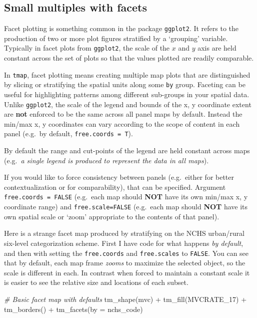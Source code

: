 \documentclass[
]{book}
\newenvironment{Shaded}{\begin{snugshade}}{\end{snugshade}}
\newcommand{\AttributeTok}[1]{\textcolor[rgb]{0.77,0.63,0.00}{#1}}
\newcommand{\CommentTok}[1]{\textcolor[rgb]{0.56,0.35,0.01}{\textit{#1}}}
\newcommand{\FunctionTok}[1]{\textcolor[rgb]{0.00,0.00,0.00}{#1}}
\newcommand{\NormalTok}[1]{#1}
\newcommand{\SpecialCharTok}[1]{\textcolor[rgb]{0.00,0.00,0.00}{#1}}
\newcommand{\StringTok}[1]{\textcolor[rgb]{0.31,0.60,0.02}{#1}}
\begin{document}
\hypertarget{tmap-facet}{%
\subsection{Small multiples with facets}\label{tmap-facet}}

Facet plotting is something common in the package \texttt{ggplot2}. It refers to the production of two or more plot figures stratified by a `grouping' variable. Typically in facet plots from \texttt{ggplot2}, the scale of the \(x\) and \(y\) axis are held constant across the set of plots so that the values plotted are readily comparable.

In \texttt{tmap}, facet plotting means creating multiple map plots that are distinguished by slicing or stratifying the spatial units along some \texttt{by} group. Faceting can be useful for highlighting patterns among different sub-groups in your spatial data. Unlike \texttt{ggplot2}, the scale of the legend and bounds of the x, y coordinate extent are \textbf{not} enforced to be the same across all panel maps by default. Instead the min/max x, y coordinates can vary according to the scope of content in each panel (e.g.~by default, \texttt{free.coords\ =\ T}).

By default the range and cut-points of the legend are held constant across maps (e.g.~\emph{a single legend is produced to represent the data in all maps}).

If you would like to force consistency between panels (e.g.~either for better contextualization or for comparability), that can be specified. Argument \texttt{free.coords\ =\ FALSE} (e.g.~each map should \textbf{NOT} have its own min/max x, y coordinate range) and \texttt{free.scale=FALSE} (e.g.~each map should \textbf{NOT} have its own spatial scale or `zoom' appropriate to the contents of that panel).

Here is a strange facet map produced by stratifying on the NCHS urban/rural six-level categorization scheme. First I have code for what happens \emph{by default}, and then with setting the \texttt{free.coords} and \texttt{free.scales} to \texttt{FALSE}. You can see that by default, each map frame \emph{zooms} to maximize the selected object, so the scale is different in each. In contrast when forced to maintain a constant scale it is easier to see the relative size and locations of each subset.

\begin{Shaded}
\begin{Highlighting}[]
\CommentTok{\# Basic facet map with defaults}
\FunctionTok{tm\_shape}\NormalTok{(mvc) }\SpecialCharTok{+}
  \FunctionTok{tm\_fill}\NormalTok{(}\StringTok{\textquotesingle{}MVCRATE\_17\textquotesingle{}}\NormalTok{) }\SpecialCharTok{+}
  \FunctionTok{tm\_borders}\NormalTok{() }\SpecialCharTok{+}
  \FunctionTok{tm\_facets}\NormalTok{(}\AttributeTok{by =} \StringTok{\textquotesingle{}nchs\_code\textquotesingle{}}\NormalTok{)}
\end{Highlighting}
\end{Shaded}
\end{document}
